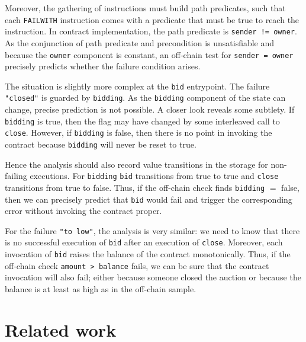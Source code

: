 \documentclass[a4paper,USenglish,american,cleveref, autoref, thm-restate]{oasics-v2021}
\begin{document}
Moreover, the gathering of instructions must build path predicates,
such that each \lstinline/FAILWITH/ instruction comes with a predicate
that must be true to reach the instruction. In contract
implementation, the path predicate is \lstinline/sender != owner/. As
the conjunction of path predicate and precondition is unsatisfiable
and because the \lstinline/owner/ component is constant, an off-chain
test for \lstinline/sender = owner/ precisely predicts whether the
failure condition arises.

The situation is slightly more complex at the \lstinline/bid/
entrypoint. The failure \lstinline/"closed"/ is guarded by
\lstinline/bidding/. As the \lstinline/bidding/ component of the state can change,
precise prediction is not possible. A closer look reveals some
subtlety. If \lstinline/bidding/ is true, then the flag may have
changed by some interleaved call to \lstinline/close/. However, if
\lstinline/bidding/ is false, then there is no point in invoking the
contract because \lstinline/bidding/ will never be reset to true.

Hence the analysis should also record value transitions in the
storage for non-failing executions. For \lstinline/bidding/
\lstinline/bid/ transitions from true to true and \lstinline/close/
transitions from true to false. Thus, if the off-chain check finds
\lstinline/bidding/ $=$ false, then we can precisely predict that
\lstinline/bid/ would fail and trigger the corresponding error without
invoking the contract proper.

For the failure \lstinline/"to low"/, the analysis is very similar:
we need to know that there is no successful execution of
\lstinline/bid/ after an execution of \lstinline/close/. Moreover,
each invocation of \lstinline/bid/ raises the balance of the contract
monotonically. Thus, if the off-chain check
\lstinline/amount > balance/ fails, we can be sure that the contract
invocation will also fail; either because someone closed the auction or
because the balance is at least as high as in the off-chain sample. 
\section{Related work}
\label{sec:related-work}
\end{document}
